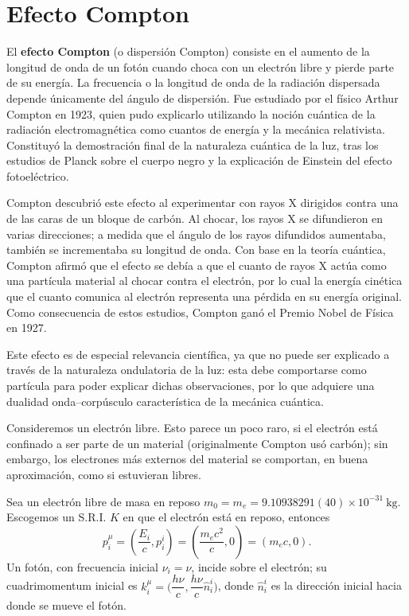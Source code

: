 \section{Efecto Compton}

El \textbf{efecto Compton} (o dispersión Compton) consiste en el
aumento de la longitud de onda de un fotón cuando choca con un electrón
libre y pierde parte de su energía. La frecuencia o la longitud de onda
de la radiación dispersada depende únicamente del ángulo de dispersión.
Fue estudiado por el físico Arthur Compton en 1923, quien pudo
explicarlo utilizando la noción cuántica de la radiación
electromagnética como cuantos de energía y la mecánica relativista.
Constituyó la demostración final de la naturaleza cuántica de la luz,
tras los estudios de Planck sobre el cuerpo negro y la explicación de
Einstein del efecto fotoeléctrico.

Compton descubrió este efecto al experimentar con rayos X dirigidos
contra una de las caras de un bloque de carbón. Al chocar, los rayos X se
difundieron en varias direcciones; a medida que el ángulo de los rayos
difundidos aumentaba, también se incrementaba su longitud de onda. Con
base en la teoría cuántica, Compton afirmó que el efecto se debía a que
el cuanto de rayos X actúa como una partícula material al chocar contra
el electrón, por lo cual la energía cinética que el cuanto comunica al
electrón representa una pérdida en su energía original. Como
consecuencia de estos estudios, Compton ganó el Premio Nobel de Física
en 1927.

Este efecto es de especial relevancia científica, ya que no puede ser
explicado a través de la naturaleza ondulatoria de la luz: esta debe
comportarse como partícula para poder explicar dichas observaciones, por
lo que adquiere una dualidad onda--corpúsculo característica de la
mecánica cuántica.

Consideremos un electrón libre. Esto parece un poco raro, si el electrón
está confinado a ser parte de un material (originalmente Compton usó
carbón); sin embargo, los electrones más externos del material se
comportan, en buena aproximación, como si estuvieran libres.

Sea un electrón libre de masa en reposo $m_0=m_e=9.10938291(40)\times
10^{-31}\ \text{kg}$. Escogemos un S.R.I. $K$ en que el electrón está en
reposo, entonces
\[
p^\mu_i = \left(\frac{E_i}{c},p^i_i\right) = \left(\frac{m_ec^2}{c},0
\right) = (m_ec,0).
\]
Un fotón, con frecuencia inicial $\nu_i=\nu$, incide sobre el electrón;
su cuadrimomentum inicial es $k^\mu_i=\Big(\dfrac{h\nu}{c},\dfrac{h\nu}{c}
\hat n^i_i\Big)$, donde $\hat n_i^i$ es la dirección inicial hacia donde
se mueve el fotón.

